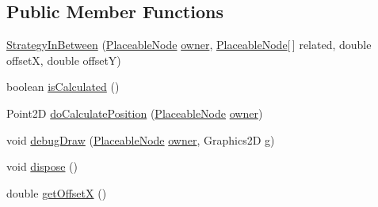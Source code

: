 \subsection*{Public Member Functions}
\begin{DoxyCompactItemize}
\item 
\hyperlink{classorg_1_1tzi_1_1use_1_1gui_1_1views_1_1diagrams_1_1elements_1_1positioning_1_1_strategy_in_between_a1e7f8999ae711ca7d305eb28eb601543}{Strategy\-In\-Between} (\hyperlink{classorg_1_1tzi_1_1use_1_1gui_1_1views_1_1diagrams_1_1elements_1_1_placeable_node}{Placeable\-Node} \hyperlink{classorg_1_1tzi_1_1use_1_1gui_1_1views_1_1diagrams_1_1elements_1_1positioning_1_1_statefull_position_strategy_ac987ea0c7e5b6ddc09cc5afb41043dfd}{owner}, \hyperlink{classorg_1_1tzi_1_1use_1_1gui_1_1views_1_1diagrams_1_1elements_1_1_placeable_node}{Placeable\-Node}\mbox{[}$\,$\mbox{]} related, double offset\-X, double offset\-Y)
\item 
boolean \hyperlink{classorg_1_1tzi_1_1use_1_1gui_1_1views_1_1diagrams_1_1elements_1_1positioning_1_1_strategy_in_between_aae179110fd760b5c107092753c96c35b}{is\-Calculated} ()
\item 
Point2\-D \hyperlink{classorg_1_1tzi_1_1use_1_1gui_1_1views_1_1diagrams_1_1elements_1_1positioning_1_1_strategy_in_between_ab4484e5c096ed824d1e25ed3882f360c}{do\-Calculate\-Position} (\hyperlink{classorg_1_1tzi_1_1use_1_1gui_1_1views_1_1diagrams_1_1elements_1_1_placeable_node}{Placeable\-Node} \hyperlink{classorg_1_1tzi_1_1use_1_1gui_1_1views_1_1diagrams_1_1elements_1_1positioning_1_1_statefull_position_strategy_ac987ea0c7e5b6ddc09cc5afb41043dfd}{owner})
\item 
void \hyperlink{classorg_1_1tzi_1_1use_1_1gui_1_1views_1_1diagrams_1_1elements_1_1positioning_1_1_strategy_in_between_abd201873296db3bf5ee55d6c9cef762f}{debug\-Draw} (\hyperlink{classorg_1_1tzi_1_1use_1_1gui_1_1views_1_1diagrams_1_1elements_1_1_placeable_node}{Placeable\-Node} \hyperlink{classorg_1_1tzi_1_1use_1_1gui_1_1views_1_1diagrams_1_1elements_1_1positioning_1_1_statefull_position_strategy_ac987ea0c7e5b6ddc09cc5afb41043dfd}{owner}, Graphics2\-D g)
\item 
void \hyperlink{classorg_1_1tzi_1_1use_1_1gui_1_1views_1_1diagrams_1_1elements_1_1positioning_1_1_strategy_in_between_ae2e2d7390259ee5c20dc88f7a35eaf3a}{dispose} ()
\item 
double \hyperlink{classorg_1_1tzi_1_1use_1_1gui_1_1views_1_1diagrams_1_1elements_1_1positioning_1_1_strategy_in_between_ac5efdd4b0bf509065d52d5fd3ba4a306}{get\-Offset\-X} ()

\end{DoxyCompactItemize}
